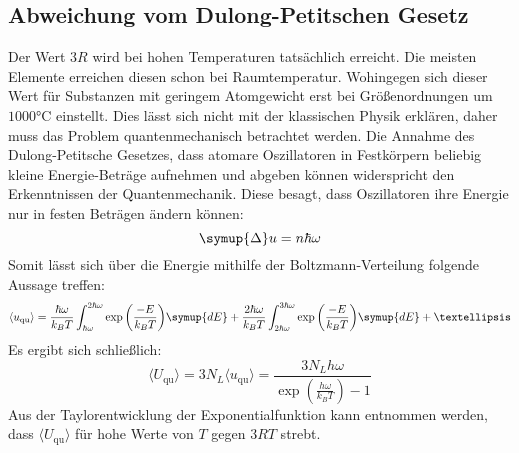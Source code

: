 \subsection{Abweichung vom Dulong-Petitschen Gesetz}
Der Wert $3R$ wird bei hohen Temperaturen tatsächlich erreicht.
Die meisten Elemente erreichen diesen schon bei Raumtemperatur.
Wohingegen sich dieser Wert für Substanzen mit geringem Atomgewicht erst bei
Größenordnungen um $1000\si{\celsius}$ einstellt.
Dies lässt sich nicht mit der klassischen Physik erklären,
daher muss das Problem quantenmechanisch betrachtet werden.
Die Annahme des Dulong-Petitsche Gesetzes, dass atomare Oszillatoren in Festkörpern
beliebig kleine Energie-Beträge aufnehmen und abgeben können widerspricht den Erkenntnissen der Quantenmechanik.
Diese besagt, dass Oszillatoren ihre Energie nur in festen Beträgen ändern können:
\begin{equation}
\symup{\Delta} u = n \hbar \omega
\end{equation}
Somit lässt sich über die Energie mithilfe der Boltzmann-Verteilung folgende Aussage treffen:
\begin{equation}
    \langle u_\text{qu} \rangle = \frac{\hbar\omega}{k_BT}\int_{\hbar\omega}^{2\hbar\omega}\exp{\left(\frac{-E}{k_BT}\right)}\symup{dE} +
                            \frac{2\hbar\omega}{k_BT}\int_{2\hbar\omega}^{3\hbar\omega}\exp{\left(\frac{-E}{k_BT}\right)}\symup{dE} + …
\end{equation}
Es ergibt sich schließlich:
\begin{equation}
    \langle U_\text{qu} \rangle = 3 N_L \langle u_\text{qu} \rangle = \frac{3 N_L h
        \omega}{\exp{\left(\frac{h\omega}{k_BT}\right)}-1}
\end{equation}
Aus der Taylorentwicklung der Exponentialfunktion kann entnommen werden,
dass $\langle U_\text{qu} \rangle$ für hohe Werte von $T$ gegen $3RT$ strebt.
